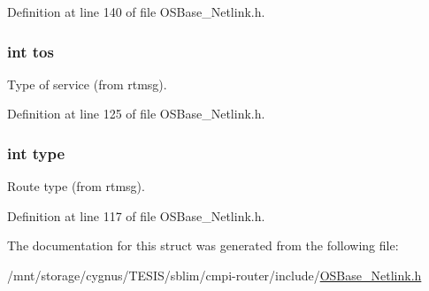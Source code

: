 Definition at line 140 of file OSBase\_\-Netlink.h.\hypertarget{structnl_route_info_a6cf1ef2d03c680cc07a080b1c7abcb46}{
\subsubsection[{tos}]{\setlength{\rightskip}{0pt plus 5cm}int {\bf tos}}}
\label{structnl_route_info_a6cf1ef2d03c680cc07a080b1c7abcb46}
Type of service (from rtmsg). 

Definition at line 125 of file OSBase\_\-Netlink.h.\hypertarget{structnl_route_info_ac765329451135abec74c45e1897abf26}{
\subsubsection[{type}]{\setlength{\rightskip}{0pt plus 5cm}int {\bf type}}}
\label{structnl_route_info_ac765329451135abec74c45e1897abf26}
Route type (from rtmsg). 

Definition at line 117 of file OSBase\_\-Netlink.h.

The documentation for this struct was generated from the following file:\begin{DoxyCompactItemize}
\item 
/mnt/storage/cygnus/TESIS/sblim/cmpi-\/router/include/\hyperlink{_o_s_base___netlink_8h}{OSBase\_\-Netlink.h}\end{DoxyCompactItemize}
